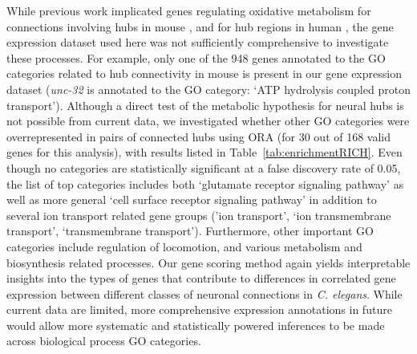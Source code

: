 \documentclass[10pt,letterpaper]{article}
\begin{document}
{While previous work implicated genes regulating oxidative metabolism for connections involving hubs in mouse \cite{Fulcher:2016ck}, and for hub regions in human \cite{Vertes2016a}, the gene expression dataset used here was not sufficiently comprehensive to investigate these processes.
For example, only one of the 948 genes annotated to the GO categories related to hub connectivity in mouse is present in our gene expression dataset (\emph{unc-32} is annotated to the GO category: `ATP hydrolysis coupled proton transport').
Although a direct test of the metabolic hypothesis for neural hubs is not possible from current data, we investigated whether other GO categories were overrepresented in pairs of connected hubs using ORA (for 30 out of 168 valid genes for this analysis), with results listed in Table~\ref{tab:enrichmentRICH}.
Even though no categories are statistically significant at a false discovery rate of 0.05, the list of top categories includes both `glutamate receptor signaling pathway' as well as more general `cell surface receptor signaling pathway' in addition to several ion transport related gene groups ('ion transport', `ion transmembrane transport', `transmembrane transport').
Furthermore, other important GO categories include regulation of locomotion, and various metabolism and biosynthesis related processes.
Our gene scoring method again yields interpretable insights into the types of genes that contribute to differences in correlated gene expression between different classes of neuronal connections in \emph{C. elegans}.
While current data are limited, more comprehensive expression annotations in future would allow more systematic and statistically powered inferences to be made across biological process GO categories.

}
\end{document}
